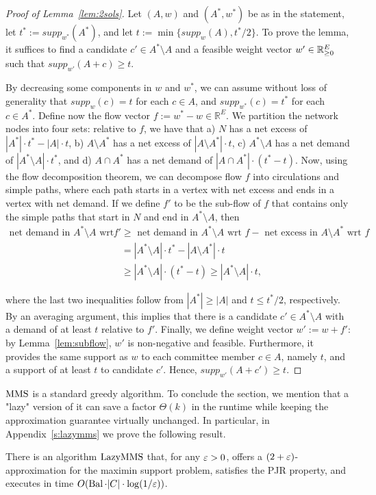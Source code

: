 \begin{proof}[Proof of Lemma~\ref{lem:2sols}]
Let $(A,w)$ and $(A^*, w^*)$ be as in the statement, let $t^*:=supp_{w^*}(A^*)$, and let $t:=\min\{supp_w(A), t^*/2\}$. To prove the lemma, it suffices to find a candidate $c'\in A^*\setminus A$ and a feasible weight vector $w'\in\mathbb{R}_{\geq 0}^E$ such that $supp_{w'}(A+c)\geq t$.

By decreasing some components in $w$ and $w^*$, we can assume without loss of generality that $supp_w(c)=t$ for each $c\in A$, and $supp_{w^*}(c)=t^*$ for each $c\in A^*$. Define now the flow vector $f:=w^* - w\in\mathbb{R}^E$. 
We partition the network nodes into four sets: relative to $f$, we have that a) $N$ has a net excess of $|A^*|\cdot t^* - |A|\cdot t$, b) $A\setminus A^*$ has a net excess of $|A\setminus A^*|\cdot t$, c) $A^*\setminus A$ has a net demand of $|A^*\setminus A|\cdot t^*$, and d) $A\cap A^*$ has a net demand of $|A\cap A^*|\cdot (t^*-t)$.
Now, using the flow decomposition theorem, we can decompose flow $f$ into circulations and simple paths, where each path starts in a vertex with net excess and ends in a vertex with net demand. If we define $f'$ to be the sub-flow of $f$ that contains only the simple paths that start in $N$ and end in $A^*\setminus A$, then %
%
\begin{align*}
    \text{net demand in $A^*\setminus A$ wrt } f' &\geq \text{ net demand in $A^*\setminus A$ wrt } f - \text{ net excess in $A\setminus A^*$ wrt } f\\
    &= |A^*\setminus A|\cdot t^* - |A\setminus A^*|\cdot t\\
    &\geq |A^*\setminus A|\cdot (t^*-t) \geq |A^*\setminus A|\cdot t,
\end{align*}

where the last two inequalities follow from $|A^*|\geq |A|$ and $t\leq t^*/2$, respectively. By an averaging argument, this implies that there is a candidate $c'\in A^*\setminus A$ with a demand of at least $t$ relative to $f'$.
Finally, we define weight vector $w':=w+f'$: by Lemma~\ref{lem:subflow}, $w'$ is non-negative and feasible. 
Furthermore, it provides the same support as $w$ to each committee member $c\in A$, namely $t$, and a support of at least $t$ to candidate $c'$. Hence, $supp_{w'}(A+c')\geq t$. 
\end{proof}

$\operatorname{MMS}$ is a standard greedy algorithm. 
To conclude the section, we mention that a "lazy" version of it can save a factor $\Theta(k)$ in the runtime while keeping the approximation guarantee virtually unchanged. 
In particular, in Appendix~\ref{s:lazymms} we prove the following result.

\begin{theorem}\label{thm:2eps}
There is an algorithm $\operatorname{LazyMMS}$ that, for any $\varepsilon>0$, offers a $(2+\varepsilon)$-approximation for the maximin support problem, satisfies the PJR property, and executes in time $O(\operatorname{Bal}\cdot |C|\cdot \log(1/\varepsilon))$.
\end{theorem}


